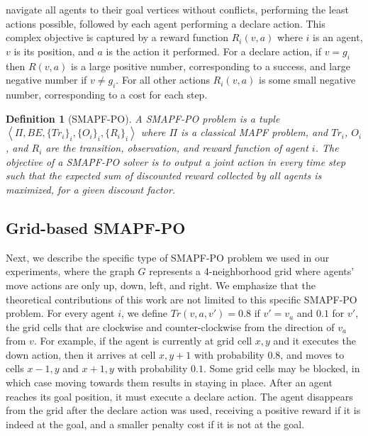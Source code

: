 \documentclass[letterpaper]{article}
\newcommand{\tuple}[1]{\ensuremath{\left \langle #1 \right \rangle }}
\newtheorem{definition}{Definition}
\begin{document}
navigate all agents to their goal vertices without conflicts, performing the least actions possible, followed by each agent performing a declare action.
This complex objective is captured by a reward function $R_i(v,a)$ where $i$ is an agent, $v$ is its position, and $a$ is the action it performed.
For a declare action, if $v=g_i$ then $R(v,a)$ is a large positive number, corresponding to a success, and large negative number if $v \neq g_i$.  For all other actions $R_i(v,a)$ is some small negative number, corresponding to a cost for each step.

\begin{definition}[SMAPF-PO]
A SMAPF-PO problem is a tuple $\tuple{\Pi,BE,\{Tr_i\}_i, \{O_i\}_i, \{R_i\}_i}$ where $\Pi$ is a classical MAPF problem, and $Tr_i$, $O_i$, and $R_i$ are the transition, observation, and reward function of agent $i$.
The objective of a SMAPF-PO solver is to output a joint action in every time step such that the expected sum of discounted reward collected by all agents is maximized, for a given discount factor.
\end{definition}



\subsection{Grid-based SMAPF-PO}

Next, we describe the specific type of SMAPF-PO problem we used in our experiments, where the graph $G$ represents a 4-neighborhood grid where agents' move actions are only up, down, left, and right. We emphasize that the theoretical contributions of this work are not limited to this specific SMAPF-PO problem.
For every agent $i$, we define $Tr(v,a,v')=0.8$ if $v'=v_a$ and $0.1$ for $v'$, the grid cells that are clockwise and counter-clockwise from the direction of $v_a$ from $v$.
For example, if the agent is currently at grid cell $x,y$ and it executes the down action, then it arrives at cell $x,y+1$ with probability $0.8$, and moves to cells $x-1,y$ and $x+1,y$ with probability $0.1$.
Some grid cells may be blocked, in which case moving towards them results in staying in place.
After an agent reaches its goal position, it must execute a declare action. The agent disappears from the grid after the declare action was used, receiving a positive reward if it is indeed at the goal, and a smaller penalty cost if it is not at the goal.
\end{document}
